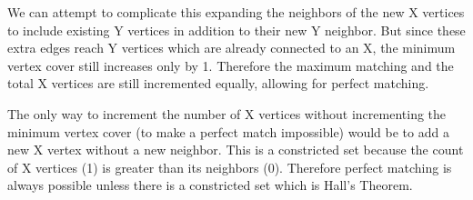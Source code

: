 \documentclass[a4paper, 11pt]{article}
\begin{document}
We can attempt to complicate this expanding the neighbors of the new X vertices to include existing Y vertices in addition to their new Y neighbor. But since these extra edges reach Y vertices which are already connected to an X, the minimum vertex cover still increases only by 1. Therefore the maximum matching and the total X vertices are still incremented equally, allowing for perfect matching. 

The only way to increment the number of X vertices without incrementing the minimum vertex cover (to make a perfect match impossible) would be to add a new X vertex without a new neighbor. This is a constricted set because the count of X vertices (1) is greater than its neighbors (0). Therefore perfect matching is always possible unless there is a constricted set which is Hall's Theorem.
\end{document}
